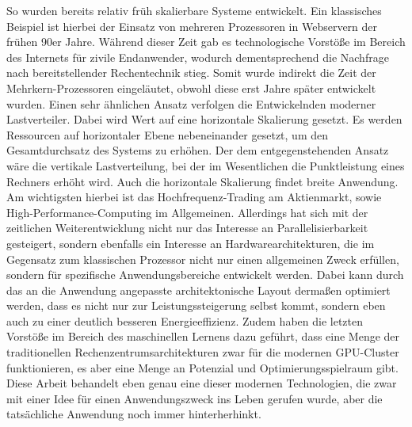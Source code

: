So wurden bereits relativ früh skalierbare Systeme entwickelt. Ein klassisches Beispiel ist hierbei der Einsatz von mehreren Prozessoren in Webservern der frühen 90er Jahre. Während dieser Zeit gab es technologische Vorstöße im Bereich des Internets für zivile Endanwender, wodurch dementsprechend die Nachfrage nach bereitstellender Rechentechnik stieg. Somit wurde indirekt die Zeit der Mehrkern-Prozessoren eingeläutet, obwohl diese erst Jahre später entwickelt wurden. Einen sehr ähnlichen Ansatz verfolgen die Entwickelnden moderner Lastverteiler. Dabei wird Wert auf eine horizontale Skalierung gesetzt. Es werden Ressourcen auf horizontaler Ebene nebeneinander gesetzt, um den Gesamtdurchsatz des Systems zu erhöhen. Der dem entgegenstehenden Ansatz wäre die vertikale Lastverteilung, bei der im Wesentlichen die Punktleistung eines Rechners erhöht wird. Auch die horizontale Skalierung findet breite Anwendung. Am wichtigsten hierbei ist das Hochfrequenz-Trading am Aktienmarkt, sowie High-Performance-Computing im Allgemeinen. \newline \newline Allerdings hat sich mit der zeitlichen Weiterentwicklung nicht nur das Interesse an Parallelisierbarkeit gesteigert, sondern ebenfalls ein Interesse an Hardwarearchitekturen, die im Gegensatz zum klassischen Prozessor nicht nur einen allgemeinen Zweck erfüllen, sondern für spezifische Anwendungsbereiche entwickelt werden. Dabei kann durch das an die Anwendung angepasste architektonische Layout dermaßen optimiert werden, dass es nicht nur zur Leistungssteigerung selbst kommt, sondern eben auch zu einer deutlich besseren Energieeffizienz. Zudem haben die letzten Vorstöße im Bereich des maschinellen Lernens dazu geführt, dass eine Menge der traditionellen Rechenzentrumsarchitekturen zwar für die modernen GPU-Cluster funktionieren, es aber eine Menge an Potenzial und Optimierungsspielraum gibt. \cite{jouppi2017datacenter} \newline \newline Diese Arbeit behandelt eben genau eine dieser modernen Technologien, die zwar mit einer Idee für einen Anwendungszweck ins Leben gerufen wurde, aber die tatsächliche Anwendung noch immer hinterherhinkt.